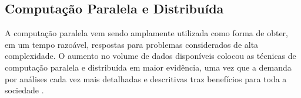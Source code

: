 \documentclass[english,brazilian]{UNISINOSmonografia} %
\begin{document}
\subsection{Computação Paralela e Distribuída}
\label{fundamentacao-computacao-distribuida}


%







A computação paralela vem sendo amplamente utilizada como forma de obter, em um tempo razoável, respostas para problemas considerados de alta complexidade.
O aumento no volume de dados disponíveis colocou as técnicas de computação paralela e distribuída em maior evidência, uma vez que a demanda por análises cada vez mais detalhadas e descritivas traz benefícios para toda a sociedade \cite{wilkinson1999parallel}.
\end{document}
